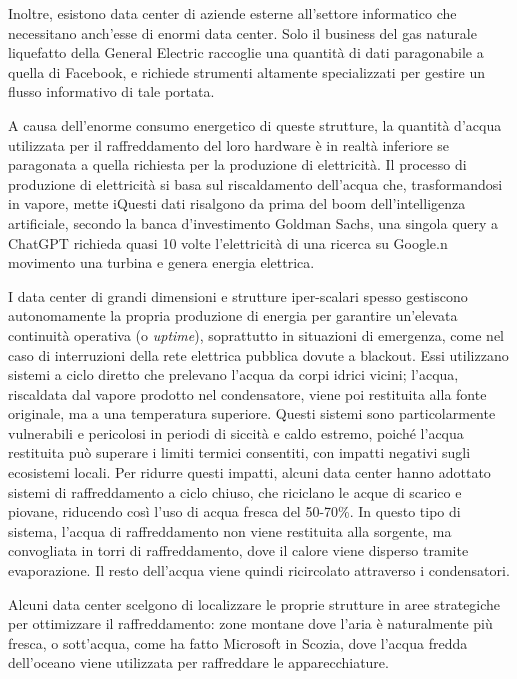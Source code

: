 \documentclass[12pt,a4paper,oneside]{book}
\begin{document}
Inoltre, esistono data center di aziende esterne all'settore informatico che necessitano anch'esse di enormi data center. Solo il business del gas naturale liquefatto della General Electric raccoglie una quantità di dati paragonabile a quella di Facebook, e richiede strumenti altamente specializzati per gestire un flusso informativo di tale portata. \citep[p.40]{srnicek2017platform}

A causa dell'enorme consumo energetico di queste strutture, la quantità d'acqua utilizzata per il raffreddamento del loro hardware è in realtà inferiore se paragonata a quella richiesta per la produzione di elettricità. Il processo di produzione di elettricità si basa sul riscaldamento dell'acqua che, trasformandosi in vapore, mette iQuesti dati risalgono da prima del boom dell'intelligenza artificiale, secondo la banca d'investimento Goldman Sachs, una singola query a ChatGPT richieda quasi 10 volte l'elettricità di una ricerca su Google.n movimento una turbina e genera energia elettrica.

I data center di grandi dimensioni e strutture iper-scalari spesso gestiscono autonomamente la propria produzione di energia per garantire un'elevata continuità operativa (o \textit{uptime}), soprattutto in situazioni di emergenza, come nel caso di interruzioni della rete elettrica pubblica dovute a blackout.
Essi utilizzano sistemi a ciclo diretto che prelevano l'acqua da corpi idrici vicini; l'acqua, riscaldata dal vapore prodotto nel condensatore, viene poi restituita alla fonte originale, ma a una temperatura superiore. Questi sistemi sono particolarmente vulnerabili e pericolosi in periodi di siccità e caldo estremo, poiché l'acqua restituita può superare i limiti termici consentiti, con impatti negativi sugli ecosistemi locali.
Per ridurre questi impatti, alcuni data center hanno adottato sistemi di raffreddamento a ciclo chiuso, che riciclano le acque di scarico e piovane, riducendo così l'uso di acqua fresca del 50-70\%. In questo tipo di sistema, l'acqua di raffreddamento non viene restituita alla sorgente, ma convogliata in torri di raffreddamento, dove il calore viene disperso tramite evaporazione. Il resto dell'acqua viene quindi ricircolato attraverso i condensatori.

Alcuni data center scelgono di localizzare le proprie strutture in aree strategiche per ottimizzare il raffreddamento: zone montane dove l'aria è naturalmente più fresca, o sott'acqua, come ha fatto Microsoft in Scozia, dove l'acqua fredda dell'oceano viene utilizzata per raffreddare le apparecchiature.
\end{document}
